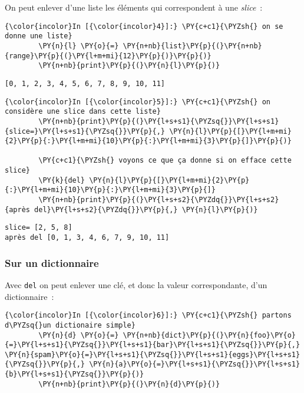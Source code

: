     On peut enlever d'une liste les éléments qui correspondent à une
\emph{slice}~:

    \begin{Verbatim}[commandchars=\\\{\}]
{\color{incolor}In [{\color{incolor}4}]:} \PY{c+c1}{\PYZsh{} on se donne une liste}
        \PY{n}{l} \PY{o}{=} \PY{n+nb}{list}\PY{p}{(}\PY{n+nb}{range}\PY{p}{(}\PY{l+m+mi}{12}\PY{p}{)}\PY{p}{)}
        \PY{n+nb}{print}\PY{p}{(}\PY{n}{l}\PY{p}{)}
\end{Verbatim}


    \begin{Verbatim}[commandchars=\\\{\}]
[0, 1, 2, 3, 4, 5, 6, 7, 8, 9, 10, 11]

    \end{Verbatim}

    \begin{Verbatim}[commandchars=\\\{\}]
{\color{incolor}In [{\color{incolor}5}]:} \PY{c+c1}{\PYZsh{} on considère une slice dans cette liste}
        \PY{n+nb}{print}\PY{p}{(}\PY{l+s+s1}{\PYZsq{}}\PY{l+s+s1}{slice=}\PY{l+s+s1}{\PYZsq{}}\PY{p}{,} \PY{n}{l}\PY{p}{[}\PY{l+m+mi}{2}\PY{p}{:}\PY{l+m+mi}{10}\PY{p}{:}\PY{l+m+mi}{3}\PY{p}{]}\PY{p}{)}
        
        \PY{c+c1}{\PYZsh{} voyons ce que ça donne si on efface cette slice}
        \PY{k}{del} \PY{n}{l}\PY{p}{[}\PY{l+m+mi}{2}\PY{p}{:}\PY{l+m+mi}{10}\PY{p}{:}\PY{l+m+mi}{3}\PY{p}{]}
        \PY{n+nb}{print}\PY{p}{(}\PY{l+s+s2}{\PYZdq{}}\PY{l+s+s2}{après del}\PY{l+s+s2}{\PYZdq{}}\PY{p}{,} \PY{n}{l}\PY{p}{)}
\end{Verbatim}


    \begin{Verbatim}[commandchars=\\\{\}]
slice= [2, 5, 8]
après del [0, 1, 3, 4, 6, 7, 9, 10, 11]

    \end{Verbatim}

    \hypertarget{sur-un-dictionnaire}{%
\subsubsection{Sur un dictionnaire}\label{sur-un-dictionnaire}}

    Avec \texttt{del} on peut enlever une clé, et donc la valeur
correspondante, d'un dictionnaire~:

    \begin{Verbatim}[commandchars=\\\{\}]
{\color{incolor}In [{\color{incolor}6}]:} \PY{c+c1}{\PYZsh{} partons d\PYZsq{}un dictionaire simple}
        \PY{n}{d} \PY{o}{=} \PY{n+nb}{dict}\PY{p}{(}\PY{n}{foo}\PY{o}{=}\PY{l+s+s1}{\PYZsq{}}\PY{l+s+s1}{bar}\PY{l+s+s1}{\PYZsq{}}\PY{p}{,} \PY{n}{spam}\PY{o}{=}\PY{l+s+s1}{\PYZsq{}}\PY{l+s+s1}{eggs}\PY{l+s+s1}{\PYZsq{}}\PY{p}{,} \PY{n}{a}\PY{o}{=}\PY{l+s+s1}{\PYZsq{}}\PY{l+s+s1}{b}\PY{l+s+s1}{\PYZsq{}}\PY{p}{)}
        \PY{n+nb}{print}\PY{p}{(}\PY{n}{d}\PY{p}{)}
\end{Verbatim}


